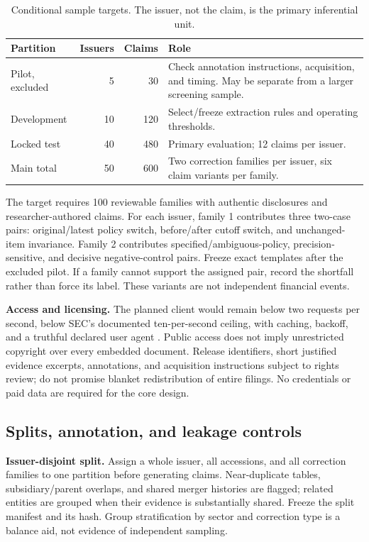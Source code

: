 \documentclass[11pt,a4paper]{article}
\newcommand{\pbreak}{\clearpage}
\newcommand{\lead}[1]{\textbf{\color{navy}#1}}
\begin{document}
\begin{table}[H]\caption{Conditional sample targets. The issuer, not the claim, is the primary inferential unit.}
\small\begin{tabularx}{\linewidth}{p{.22\linewidth}rrY}\toprule
Partition & Issuers & Claims & Role\\\midrule
Pilot, excluded & 5 & 30 & Check annotation instructions, acquisition, and timing. May be separate from a larger screening sample.\\
Development & 10 & 120 & Select/freeze extraction rules and operating thresholds.\\
Locked test & 40 & 480 & Primary evaluation; 12 claims per issuer.\\
Main total & 50 & 600 & Two correction families per issuer, six claim variants per family.\\\bottomrule
\end{tabularx}\end{table}

The target requires 100 reviewable families with authentic disclosures and researcher-authored claims. For each issuer, family 1 contributes three two-case pairs: original/latest policy switch, before/after cutoff switch, and unchanged-item invariance. Family 2 contributes specified/ambiguous-policy, precision-sensitive, and decisive negative-control pairs. Freeze exact templates after the excluded pilot. If a family cannot support the assigned pair, record the shortfall rather than force its label. These variants are not independent financial events.

\lead{Access and licensing.} The planned client would remain below two requests per second, below SEC's documented ten-per-second ceiling, with caching, backoff, and a truthful declared user agent \cite{secpolicy}. Public access does not imply unrestricted copyright over every embedded document. Release identifiers, short justified evidence excerpts, annotations, and acquisition instructions subject to rights review; do not promise blanket redistribution of entire filings. No credentials or paid data are required for the core design.

\pbreak
\subsection{Splits, annotation, and leakage controls}
\lead{Issuer-disjoint split.} Assign a whole issuer, all accessions, and all correction families to one partition before generating claims. Near-duplicate tables, subsidiary/parent overlaps, and shared merger histories are flagged; related entities are grouped when their evidence is substantially shared. Freeze the split manifest and its hash. Group stratification by sector and correction type is a balance aid, not evidence of independent sampling.
\end{document}
